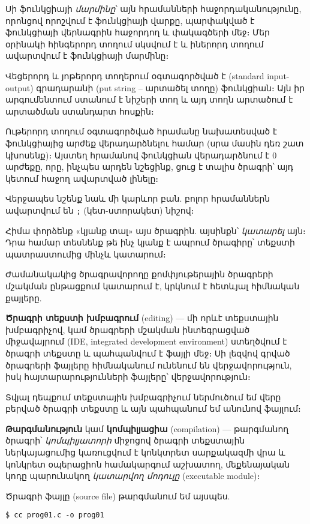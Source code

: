 Սի ֆունկցիայի \emph{մարմինը}՝ այն հրամանների հաջորդականությունը,
որոնցով որոշվում է ֆունկցիայի վարքը, պարփակված է ֆունկցիայի
վերնագրին հաջոր\-դող \code{\{} և \code{\}} փակագծերի մեջ։ Մեր
օրինակի հինգերորդ տողում սկսվում է և իներորդ տողում ավարտվում է
 ֆունկցիայի մարմինը։

Վեցերորդ և յոթերորդ տողերում օգտագործված է 
(standard input-output) գրադարանի 
(put string -- արտածել տողը) ֆունկցիան։ Այն իր արգումեն\-տում
ստանում է նիշերի տող և այդ տողն արտածում է 
արտածման ստան\-դարտ հոսքին։

Ութերորդ տողում օգտագործված  հրամանը
նախատեսված է ֆունկ\-ցիայից արժեք վերադարձնելու համար (սրա մասին
դեռ շատ կխոսենք)։ Այստեղ  հրամանով  ֆունկցիան
վերադարձնում է \(0\) արժեքը, որը, ինչպես արդեն նշեցինք, ցուց է
տալիս ծրագրի՝ այդ կետում հաջող ավարտված լինելը։

Վերջապես նշենք նաև մի կարևոր բան. բոլոր հրամաններն ավարտվում
են \verb|;| (կետ-ստորակետ) նիշով։

\smallskip
Հիմա փորձենք «կյանք տալ» այս ծրագրին. այսինքն՝ \emph{կատարել} այն։
Դրա համար տեսնենք թե ինչ կյանք է ապրում ծրագիրը՝ տեքստի պատրաստումից
մինչև կատարում։

Ժամանակակից ծրագրավորողը քոմփյութերային ծրագրերի մշակման ընթաց\-քում
կատարում է, կրկնում է հետևյալ հիմնական քայլերը.

\textbf{Ծրագրի տեքստի խմբագրում} (editing) --- մի որևէ տեքստային
խմբագրիչով, կամ ծրագրերի մշակման ինտեգրացված միջավայրում (IDE,
integrated development environment) ստեղծվում է ծրագրի տեքստը և
պահպանվում է ֆայլի մեջ։ Սի լեզվով գրված ծրագրերի ֆայլերը հիմնականում
ունենում են  վերջավորութ\-յուն, իսկ հայտարարությունների
ֆայլերը՝  վերջավորություն։

Տվյալ դեպքում տեքստային խմբագրիչում ներմուծում եմ վերը բերված ծրագրի
տեքստը և այն պահպանում եմ  անունով ֆայլում։


\textbf{Թարգմանություն} կամ \textbf{կոմպիլյացիա} (compilation) ---
թարգմանող ծրագրի՝ \emph{կոմպիլյատորի} միջոցով ծրագրի տեքստային
ներկայացումից կառուցվում է կոնկտրետ սարքակազմի վրա և կոնկրետ
օպերացիոն համակարգում աշխատող, մեքենայական կոդը պարունակող
\emph{կատարվող մոդուլը} (executable module)։

Ծրագրի  ֆայլը (source file) թարգմանում եմ այսպես.

\begin{Verbatim}
$ cc prog01.c -o prog01
\end{Verbatim}

